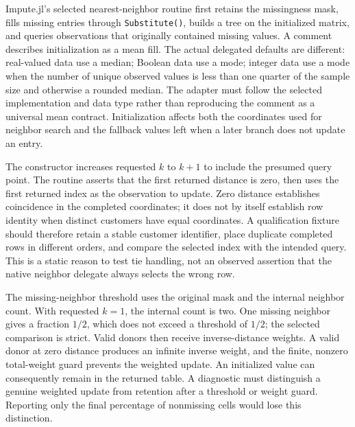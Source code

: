 Impute.jl's selected nearest-neighbor routine first retains the missingness mask, fills missing entries through \texttt{Substitute()}, builds a tree on the initialized matrix, and queries observations that originally contained missing values. A comment describes initialization as a mean fill. The actual delegated defaults are different: real-valued data use a median; Boolean data use a mode; integer data use a mode when the number of unique observed values is less than one quarter of the sample size and otherwise a rounded median. The adapter must follow the selected implementation and data type rather than reproducing the comment as a universal mean contract. Initialization affects both the coordinates used for neighbor search and the fallback values left when a later branch does not update an entry.~\citep{exec25_otm_imputejl}

The constructor increases requested $k$ to $k+1$ to include the presumed query point. The routine asserts that the first returned distance is zero, then uses the first returned index as the observation to update. Zero distance establishes coincidence in the completed coordinates; it does not by itself establish row identity when distinct customers have equal coordinates. A qualification fixture should therefore retain a stable customer identifier, place duplicate completed rows in different orders, and compare the selected index with the intended query. This is a static reason to test tie handling, not an observed assertion that the native neighbor delegate always selects the wrong row.~\citep{exec25_otm_imputejl,exec25_otm_choice}

The missing-neighbor threshold uses the original mask and the internal neighbor count. With requested $k=1$, the internal count is two. One missing neighbor gives a fraction $1/2$, which does not exceed a threshold of $1/2$; the selected comparison is strict. Valid donors then receive inverse-distance weights. A valid donor at zero distance produces an infinite inverse weight, and the finite, nonzero total-weight guard prevents the weighted update. An initialized value can consequently remain in the returned table. A diagnostic must distinguish a genuine weighted update from retention after a threshold or weight guard. Reporting only the final percentage of nonmissing cells would lose this distinction.~\citep{exec25_otm_imputejl,exec25_otm_choice}

